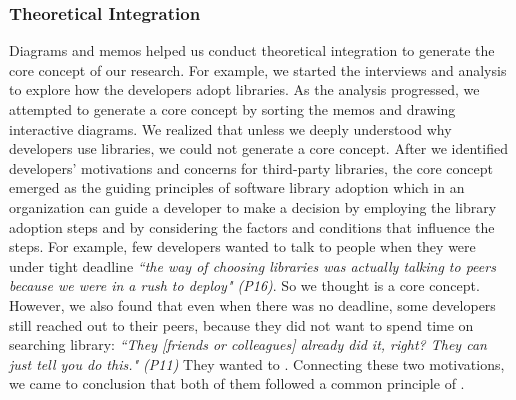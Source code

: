 \subsubsection{Theoretical Integration} 
Diagrams and memos helped us conduct theoretical integration to generate the core concept of our research. For example, we started the interviews and analysis to explore how the developers adopt libraries. As the analysis progressed, we attempted to generate a core concept by sorting the memos and drawing interactive diagrams. We realized that unless we deeply understood why developers use libraries, we could not generate a core concept. After we identified developers' motivations and concerns for third-party libraries, the core concept emerged as the guiding principles of software library adoption which in an organization can guide a developer to make a decision by employing the library adoption steps and by considering the factors and conditions that influence the steps. 
For example, few developers wanted to talk to people when they were under tight deadline \emph{``the way of choosing libraries was actually talking to peers because we were in a rush to deploy" (P16)}. So we thought  is a core concept. However, we also found that even when there was no deadline, some developers still reached out to their peers, because they did not want to spend time on searching library: \emph{``They [friends or colleagues] already did it, right? They can just tell you do this." (P11)}%
They wanted to . Connecting these two motivations, we came to conclusion that both of them followed a common principle of . 



